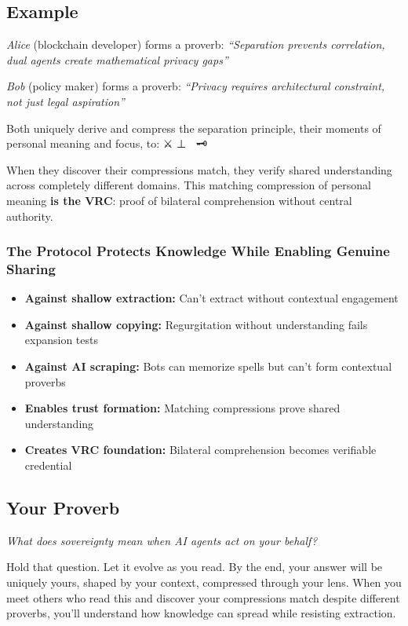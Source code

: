 \documentclass[
]{article}
\begin{document}
\subsection{Example}\label{example}

\emph{Alice} (blockchain developer) forms a proverb: \emph{``Separation
prevents correlation, dual agents create mathematical privacy gaps''}

\emph{Bob} (policy maker) forms a proverb: \emph{``Privacy requires
architectural constraint, not just legal aspiration''}

Both uniquely derive and compress the separation principle, their
moments of personal meaning and focus, to: ⚔️ ⊥ 🔮 \textbar{} 🗝️

When they discover their compressions match, they verify shared
understanding across completely different domains. This matching
compression of personal meaning \textbf{is the VRC}: proof of bilateral
comprehension without central authority.

\subsubsection{The Protocol Protects Knowledge While Enabling Genuine
Sharing}\label{the-protocol-protects-knowledge-while-enabling-genuine-sharing}

\begin{itemize}
\item
  \textbf{Against shallow extraction:} Can't extract without contextual
  engagement
\item
  \textbf{Against shallow copying:} Regurgitation without understanding
  fails expansion tests
\item
  \textbf{Against AI scraping:} Bots can memorize spells but can't form
  contextual proverbs
\item
  \textbf{Enables trust formation:} Matching compressions prove shared
  understanding
\item
  \textbf{Creates VRC foundation:} Bilateral comprehension becomes
  verifiable credential
\end{itemize}

\subsection{Your Proverb}\label{your-proverb}

\emph{What does sovereignty mean when AI agents act on your behalf?}

Hold that question. Let it evolve as you read. By the end, your answer
will be uniquely yours, shaped by your context, compressed through your
lens. When you meet others who read this and discover your compressions
match despite different proverbs, you'll understand how knowledge can
spread while resisting extraction.
\end{document}
